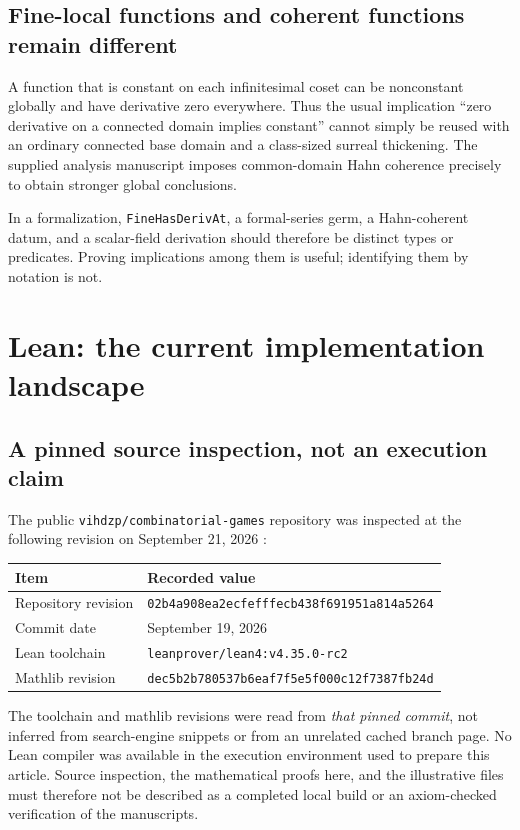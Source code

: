 \documentclass[11pt,letterpaper]{article}
\numberwithin{equation}{section}
\theoremstyle{definition}
\theoremstyle{remark}
\begin{document}
\subsection{Fine-local functions and coherent functions remain different}
A function that is constant on each infinitesimal coset can be nonconstant globally and have derivative zero everywhere. Thus the usual implication ``zero derivative on a connected domain implies constant'' cannot simply be reused with an ordinary connected base domain and a class-sized surreal thickening. The supplied analysis manuscript imposes common-domain Hahn coherence precisely to obtain stronger global conclusions.

In a formalization, \texttt{FineHasDerivAt}, a formal-series germ, a Hahn-coherent datum, and a scalar-field derivation should therefore be distinct types or predicates. Proving implications among them is useful; identifying them by notation is not.

\section{Lean: the current implementation landscape}\label{sec:leanstatus}
\subsection{A pinned source inspection, not an execution claim}
The public \texttt{vihdzp/combinatorial-games} repository was inspected at the following revision on September 21, 2026 \cite{LeanGames}:
\begin{center}\small
\begin{tabular}{@{}L{0.22\textwidth}L{0.71\textwidth}@{}}
\toprule
Item & Recorded value\\\midrule
Repository revision & \texttt{02b4a908ea2ecfefffecb438f691951a814a5264}\\
Commit date & September 19, 2026\\
Lean toolchain & \texttt{leanprover/lean4:v4.35.0-rc2}\\
Mathlib revision & \texttt{dec5b2b780537b6eaf7f5e5f000c12f7387fb24d}\\
\bottomrule
\end{tabular}
\end{center}
The toolchain and mathlib revisions were read from \emph{that pinned commit}, not inferred from search-engine snippets or from an unrelated cached branch page. No Lean compiler was available in the execution environment used to prepare this article. Source inspection, the mathematical proofs here, and the illustrative files must therefore not be described as a completed local build or an axiom-checked verification of the manuscripts.
\end{document}
